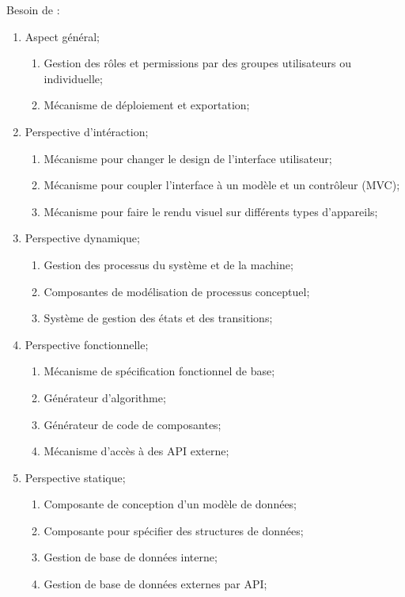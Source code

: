 Besoin de : 
\begin{enumerate}
    \item Aspect général;
    \begin{enumerate}
        \item Gestion des rôles et permissions par des groupes utilisateurs ou individuelle;
        \item Mécanisme de déploiement et exportation;
    \end{enumerate}
    \item Perspective d’intéraction;
    \begin{enumerate}
        \item Mécanisme pour changer le design de l’interface utilisateur;
        \item Mécanisme pour coupler l’interface à un modèle et un contrôleur (MVC);
        \item Mécanisme pour faire le rendu visuel sur différents types d’appareils;
    \end{enumerate}
    \item Perspective dynamique;
    \begin{enumerate}
        \item Gestion des processus du système et de la machine;
        \item Composantes de modélisation de processus conceptuel;
        \item Système de gestion des états et des transitions;
    \end{enumerate}
    \item Perspective fonctionnelle;
    \begin{enumerate}
        \item Mécanisme de spécification fonctionnel de base;
        \item Générateur d’algorithme;
        \item Générateur de code de composantes;
        \item Mécanisme d’accès à des API externe;
    \end{enumerate}
    \item Perspective statique;
    \begin{enumerate}
        \item Composante de conception d’un modèle de données;
        \item Composante pour spécifier des structures de données;
        \item Gestion de base de données interne;
        \item Gestion de base de données externes par API;
    \end{enumerate}
\end{enumerate}

